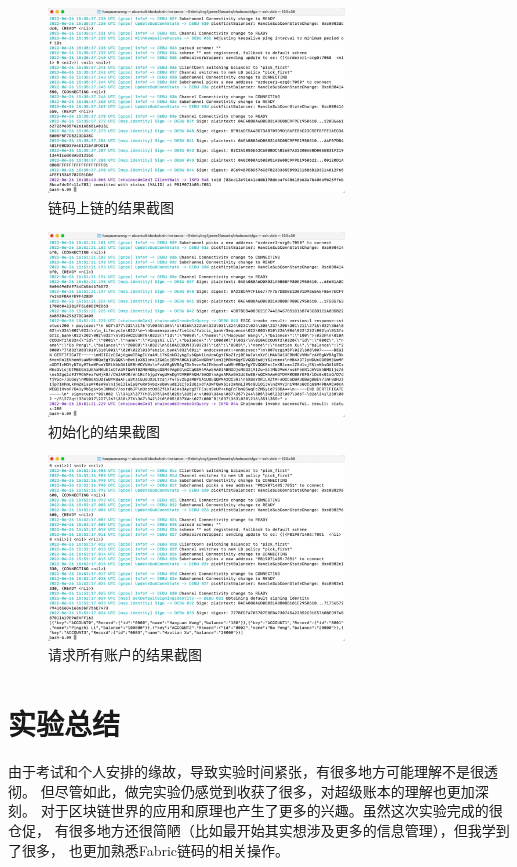\documentclass{article}
\begin{document}
    \begin{figure}[H]
        \centering
        \includegraphics[width=0.7\textwidth]{./figs/上链.jpg}
        \caption{链码上链的结果截图}
    \end{figure}
    \begin{figure}[H]
        \centering
        \includegraphics[width=0.7\textwidth]{./figs/init_result.jpg}
        \caption{初始化的结果截图}
    \end{figure}
    \begin{figure}[H]
        \centering
        \includegraphics[width=0.7\textwidth]{./figs/invoke_result.jpg}
        \caption{请求所有账户的结果截图}
    \end{figure}
    \section{实验总结}
    由于考试和个人安排的缘故，导致实验时间紧张，有很多地方可能理解不是很透彻。
    但尽管如此，做完实验仍感觉到收获了很多，对超级账本的理解也更加深刻。
    对于区块链世界的应用和原理也产生了更多的兴趣。虽然这次实验完成的很仓促，
    有很多地方还很简陋（比如最开始其实想涉及更多的信息管理），但我学到了很多，
    也更加熟悉Fabric链码的相关操作。
\end{document}
